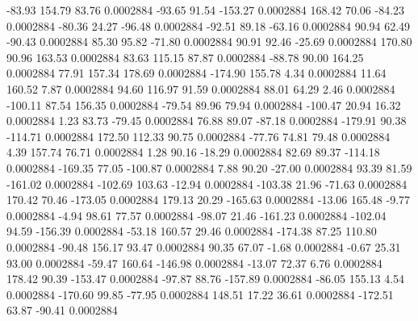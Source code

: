       -83.93      154.79       83.76     0.0002884
      -93.65       91.54     -153.27     0.0002884
      168.42       70.06      -84.23     0.0002884
      -80.36       24.27      -96.48     0.0002884
      -92.51       89.18      -63.16     0.0002884
       90.94       62.49      -90.43     0.0002884
       85.30       95.82      -71.80     0.0002884
       90.91       92.46      -25.69     0.0002884
      170.80       90.96      163.53     0.0002884
       83.63      115.15       87.87     0.0002884
      -88.78       90.00      164.25     0.0002884
       77.91      157.34      178.69     0.0002884
     -174.90      155.78        4.34     0.0002884
       11.64      160.52        7.87     0.0002884
       94.60      116.97       91.59     0.0002884
       88.01       64.29        2.46     0.0002884
     -100.11       87.54      156.35     0.0002884
      -79.54       89.96       79.94     0.0002884
     -100.47       20.94       16.32     0.0002884
        1.23       83.73      -79.45     0.0002884
       76.88       89.07      -87.18     0.0002884
     -179.91       90.38     -114.71     0.0002884
      172.50      112.33       90.75     0.0002884
      -77.76       74.81       79.48     0.0002884
        4.39      157.74       76.71     0.0002884
        1.28       90.16      -18.29     0.0002884
       82.69       89.37     -114.18     0.0002884
     -169.35       77.05     -100.87     0.0002884
        7.88       90.20      -27.00     0.0002884
       93.39       81.59     -161.02     0.0002884
     -102.69      103.63      -12.94     0.0002884
     -103.38       21.96      -71.63     0.0002884
      170.42       70.46     -173.05     0.0002884
      179.13       20.29     -165.63     0.0002884
      -13.06      165.48       -9.77     0.0002884
       -4.94       98.61       77.57     0.0002884
      -98.07       21.46     -161.23     0.0002884
     -102.04       94.59     -156.39     0.0002884
      -53.18      160.57       29.46     0.0002884
     -174.38       87.25      110.80     0.0002884
      -90.48      156.17       93.47     0.0002884
       90.35       67.07       -1.68     0.0002884
       -0.67       25.31       93.00     0.0002884
      -59.47      160.64     -146.98     0.0002884
      -13.07       72.37        6.76     0.0002884
      178.42       90.39     -153.47     0.0002884
      -97.87       88.76     -157.89     0.0002884
      -86.05      155.13        4.54     0.0002884
     -170.60       99.85      -77.95     0.0002884
      148.51       17.22       36.61     0.0002884
     -172.51       63.87      -90.41     0.0002884
